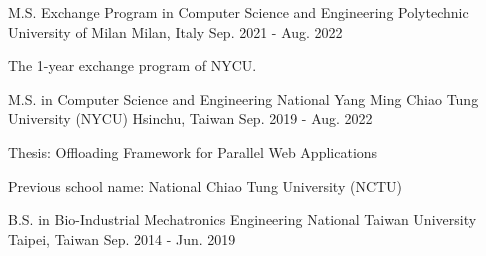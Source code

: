 

\begin{cventries}

  \cventry
    {M.S. Exchange Program in Computer Science and Engineering} %
    {Polytechnic University of Milan} %
    {Milan, Italy} %
    {Sep. 2021 - Aug. 2022} %
    {
      \begin{cvitems} %
        \item {The 1-year exchange program of NYCU.}
      \end{cvitems}
    }

  \cventry
    {M.S. in Computer Science and Engineering} %
    {National Yang Ming Chiao Tung University (NYCU)} %
    {Hsinchu, Taiwan} %
    {Sep. 2019 - Aug. 2022} %
    {
      \begin{cvitems} %
        \item {Thesis: Offloading Framework for Parallel Web Applications}
        \item {Previous school name: National Chiao Tung University (NCTU)}
      \end{cvitems}
    }

  \cventry
    {B.S. in Bio-Industrial Mechatronics Engineering} %
    {National Taiwan University} %
    {Taipei, Taiwan} %
    {Sep. 2014 - Jun. 2019} %
    {
      \begin{cvitems} %
      \end{cvitems}
    }

\end{cventries}
